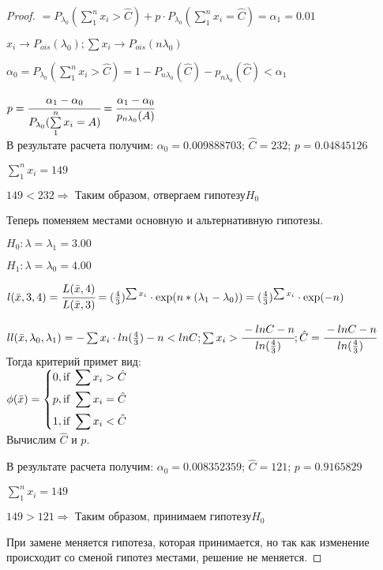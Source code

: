 \begin{proof}
		$= P_{\lambda_0}(\sum\limits_1^nx_i>\hat{C})+p\cdot P_{\lambda_0}(\sum\limits_1^nx_i=\hat{C})=\alpha_1=0.01$ 
		
		$x_i \rightarrow P_{ois}(\lambda_0); \sum x_i \rightarrow P_{ois}(n\lambda_0)$ 
		
		$\alpha_0=P_{\lambda_0}(\sum\limits_1^nx_i>\hat{C})=1-P_{n\lambda_0}(\hat{C})-p_{n\lambda_0}(\hat{C})<\alpha_1$
		
		$p=\cfrac{\alpha_1-\alpha_0}{P_{\lambda_0}(\sum\limits_1^nx_i=A)}=\cfrac{\alpha_1-\alpha_0}{p_{n\lambda_0}(A)}$ \\
	
	В результате расчета получим: $\alpha_0=0.009888703$; $\hat{C}=232$; $p=0.04845126$ 
	
		$\sum\limits_1^nx_i=149$
		
		$149<232\Rightarrow\text{ Таким образом, отвергаем гипотезу} H_0$

	Теперь поменяем местами основную и альтернативную гипотезы.	
	
	$H_0:\lambda=\lambda_1=3.00$ 
	
	$H_1:\lambda=\lambda_0=4.00$ 
	
		$l(\bar x, 3, 4)=\cfrac{L(\bar x, 4)}{L(\bar x, 3)}=(\frac43)^{\sum x_i}\cdot \exp(n*(\lambda_1-\lambda_0))=(\frac43)^{\sum x_i}\cdot \exp(-n)$ 
		
		$ll(\bar x, \lambda_0, \lambda_1)=-\sum x_i\cdot ln(\frac43)-n<lnC; \sum x_i > \cfrac{-lnC-n}{ln(\frac43)}; \hat{C}=\cfrac{-lnC-n}{ln(\frac43)}$ \\

	Тогда критерий примет вид: \\
	
	$\phi(\bar x)=\left\{
	\begin{gathered}
		0, \text{if } \sum x_i>\hat{C} \hfill \\
		p, \text{if } \sum x_i=\hat{C} \hfill \\
		1, \text{if } \sum x_i<\hat{C} \hfill \\ 
	\end{gathered}
	\right.$	\\
	
	Вычислим $\hat{C}$ и $p$.		
	
	В результате расчета получим: $\alpha_0=0.008352359$; $\hat{C}=121$; $p=0.9165829$
	
		$\sum\limits_1^nx_i=149$

		$149>121\Rightarrow\text{ Таким образом, принимаем гипотезу} H_0$ 

	
	При замене меняется гипотеза, которая принимается, но так как изменение происходит со сменой гипотез местами, решение не меняется.
\end{proof}

